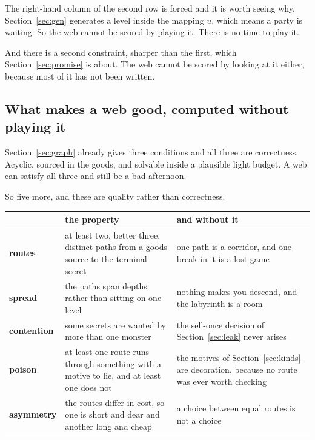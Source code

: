 \documentclass[11pt,a4paper]{article}
\begin{document}
The right-hand column of the second row is forced and it is worth seeing why. Section~\ref{sec:gen}
generates a level inside the mapping $u$, which means a party is waiting. So the web cannot be
scored by playing it. There is no time to play it.

And there is a second constraint, sharper than the first, which Section~\ref{sec:promise} is
about. The web cannot be scored by looking at it either, because most of it has not been written.

\subsection{What makes a web good, computed without playing it}

Section~\ref{sec:graph} already gives three conditions and all three are correctness. Acyclic,
sourced in the goods, and solvable inside a plausible light budget. A web can satisfy all three and
still be a bad afternoon.

So five more, and these are quality rather than correctness.

\begin{center}
\begin{tabular}{@{}l@{\hspace{3mm}}>{\raggedright\arraybackslash}p{}@{\hspace{3mm}}>{\raggedright\arraybackslash}p{}@{}}
\toprule
& \textbf{the property} & \textbf{and without it} \\
\midrule
\textbf{routes} & at least two, better three, distinct paths from a goods source to the terminal
secret &
one path is a corridor, and one break in it is a lost game \\[1mm]
\textbf{spread} & the paths span depths rather than sitting on one level &
nothing makes you descend, and the labyrinth is a room \\[1mm]
\textbf{contention} & some secrets are wanted by more than one monster &
the sell-once decision of Section~\ref{sec:leak} never arises \\[1mm]
\textbf{poison} & at least one route runs through something with a motive to lie, and at least one does not &
the motives of Section~\ref{sec:kinds} are decoration, because no route was ever worth checking \\[1mm]
\textbf{asymmetry} & the routes differ in cost, so one is short and dear and another long and cheap &
a choice between equal routes is not a choice \\
\bottomrule
\end{tabular}
\end{center}
\end{document}

